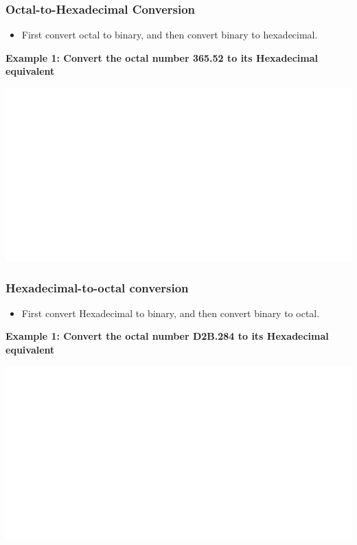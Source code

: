 \documentclass[]{book}
\providecommand{\tightlist}{%
  \setlength{\itemsep}{0pt}\setlength{\parskip}{0pt}}
\begin{document}
\hypertarget{octal-to-hexadecimal-conversion}{%
\subsubsection{Octal-to-Hexadecimal Conversion}\label{octal-to-hexadecimal-conversion}}

\begin{itemize}
\tightlist
\item
  First convert octal to binary, and then convert binary to hexadecimal.
\end{itemize}

\textbf{Example 1: Convert the octal number 365.52 to its Hexadecimal equivalent}

\begin{center}\includegraphics[width=1\linewidth]{figure/NSbox20-1} \end{center}

\hypertarget{hexadecimal-to-octal-conversion}{%
\subsubsection{Hexadecimal-to-octal conversion}\label{hexadecimal-to-octal-conversion}}

\begin{itemize}
\tightlist
\item
  First convert Hexadecimal to binary, and then convert binary to octal.
\end{itemize}

\textbf{Example 1: Convert the octal number D2B.284 to its Hexadecimal equivalent}

\begin{center}\includegraphics[width=1\linewidth]{figure/NSbox21-1} \end{center}
\end{document}
